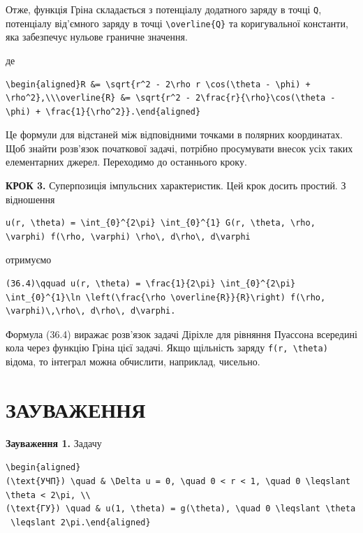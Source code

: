 \documentclass[
  ukrainian,
]{article}
\begin{document}
Отже, функція Гріна складається з потенціалу додатного заряду в точці
\texttt{Q}, потенціалу від'ємного заряду в точці
\texttt{\textbackslash{}overline\{Q\}} та коригувальної константи, яка
забезпечує нульове граничне значення.

де

\begin{verbatim}
\begin{aligned}R &= \sqrt{r^2 - 2\rho r \cos(\theta - \phi) + \rho^2},\\\overline{R} &= \sqrt{r^2 - 2\frac{r}{\rho}\cos(\theta - \phi) + \frac{1}{\rho^2}}.\end{aligned}
\end{verbatim}

Це формули для відстаней між відповідними точками в полярних
координатах. Щоб знайти розв'язок початкової задачі, потрібно
просумувати внесок усіх таких елементарних джерел. Переходимо до
останнього кроку.

\textbf{КРОК 3.} Суперпозиція імпульсних характеристик. Цей крок досить
простий. З відношення

\begin{verbatim}
u(r, \theta) = \int_{0}^{2\pi} \int_{0}^{1} G(r, \theta, \rho, \varphi) f(\rho, \varphi) \rho\, d\rho\, d\varphi
\end{verbatim}

отримуємо

\begin{verbatim}
(36.4)\qquad u(r, \theta) = \frac{1}{2\pi} \int_{0}^{2\pi} \int_{0}^{1}\ln \left(\frac{\rho \overline{R}}{R}\right) f(\rho, \varphi)\,\rho\, d\rho\, d\varphi.
\end{verbatim}

Формула (36.4) виражає розв'язок задачі Діріхле для рівняння Пуассона
всередині кола через функцію Гріна цієї задачі. Якщо щільність заряду
\texttt{f(r,\ \textbackslash{}theta)} відома, то інтеграл можна
обчислити, наприклад, чисельно.

\section{ЗАУВАЖЕННЯ}\label{ux437ux430ux443ux432ux430ux436ux435ux43dux43dux44f-5}

\textbf{Зауваження 1.} Задачу

\texttt{\textbackslash{}begin\{aligned\}(\textbackslash{}text\{УЧП\})\ \textbackslash{}quad\ \&\ \textbackslash{}Delta\ u\ =\ 0,\ \textbackslash{}quad\ 0\ \textless{}\ r\ \textless{}\ 1,\ \textbackslash{}quad\ 0\ \textbackslash{}leqslant\ \textbackslash{}theta\ \textless{}\ 2\textbackslash{}pi,\ \textbackslash{}\textbackslash{}(\textbackslash{}text\{ГУ\})\ \textbackslash{}quad\ \&\ u(1,\ \textbackslash{}theta)\ =\ g(\textbackslash{}theta),\ \textbackslash{}quad\ 0\ \textbackslash{}leqslant\ \textbackslash{}theta\ \textbackslash{}leqslant\ 2\textbackslash{}pi.\textbackslash{}end\{aligned\}}
\end{document}
